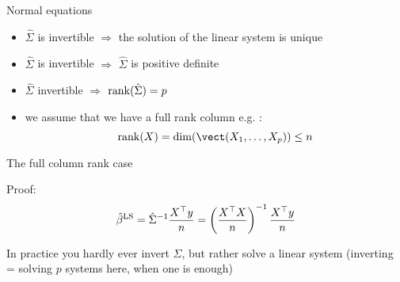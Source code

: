 \documentclass[unknownkeysallowed]{beamer}
\begin{document}
\begin{frame}{Normal equations}

\rem
    \begin{itemize}
        \item  $\hat{\Sigma}$ is invertible $\Rightarrow$ the solution of the linear system is unique
        \item $\hat{\Sigma}$ is invertible $\Rightarrow$ $\hat{\Sigma}$ is positive definite
        \item $\hat{\Sigma}$ invertible $\Rightarrow$ ${\rm rank}(\hat{\Sigma})=p$
        \item we assume that we have a full rank column e.g. : $${\rm rank}(X)=\dim(\vect(X_1,\dots,X_p)) \leq n $$
    \end{itemize}

\end{frame}


\begin{frame}{The full column rank case} %

\vspace{0.6cm}

Proof:
 $$\hat{\beta}^{\rm LS}=\hat{\Sigma}^{-1}\frac{X^{\top} y}{n}=\left(\frac{X^{\top} X}{n}\right)^{-1} \frac{X^{\top} y}{n}$$

\vspace{0.3cm}

\rem In practice you hardly ever invert $\hat{\Sigma} $, but rather solve a linear system (inverting = solving $p$ systems here, when one is enough)
\end{frame}
\end{document}
